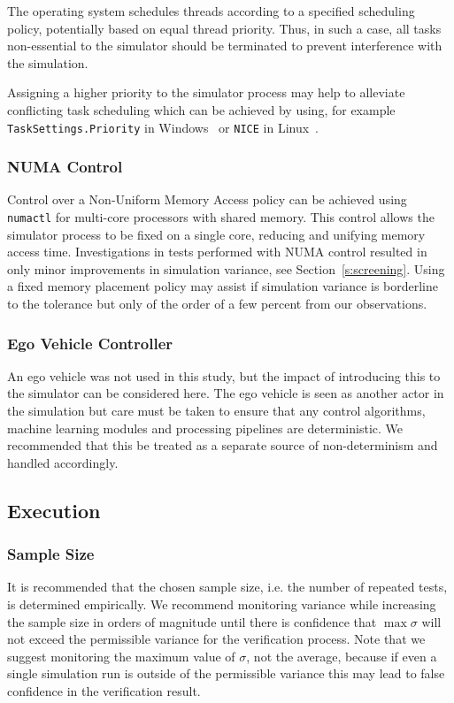 The operating system schedules threads according to a specified scheduling policy, potentially based on equal thread priority. Thus, in such a case, all tasks non-essential to the simulator should be terminated to prevent interference with the simulation. 

Assigning a higher priority to the simulator process may help to alleviate conflicting task scheduling which can be achieved by using, for example \texttt{TaskSettings.Priority} in Windows~\cite{TaskSettingWindows} or \texttt{NICE} in Linux~\cite{Nice_linux}.

\subsubsection{NUMA Control}
Control over a Non-Uniform Memory Access policy can be achieved using \texttt{numactl} for multi-core processors with shared memory. This control allows the simulator process to be fixed on a single core, reducing and unifying memory access time. Investigations in tests performed with NUMA control resulted in only minor improvements in simulation variance, see Section~\ref{s:screening}. Using a fixed memory placement policy may assist if simulation variance is borderline to the tolerance but only of the order of a few percent from our observations.

\subsubsection{Ego Vehicle Controller} 
An ego vehicle was not used in this study, but the impact of introducing this to the simulator can be considered here. The ego vehicle is seen as another actor in the simulation but care must be taken to ensure that any control algorithms, machine learning modules and processing pipelines are deterministic. We recommended that this be treated as a separate source of non-determinism and handled accordingly. 


\subsection{Execution}

\subsubsection{Sample Size}
It is recommended that the chosen sample size, i.e. the number of repeated tests, is determined empirically. We recommend monitoring variance while increasing the sample size in orders of magnitude until there is confidence that $\max\sigma$ will not exceed the permissible variance for the verification process. Note that we suggest monitoring the maximum value of $\sigma$, not the average, because if even a single simulation run is outside of the permissible variance this may lead to false confidence in the verification result.

